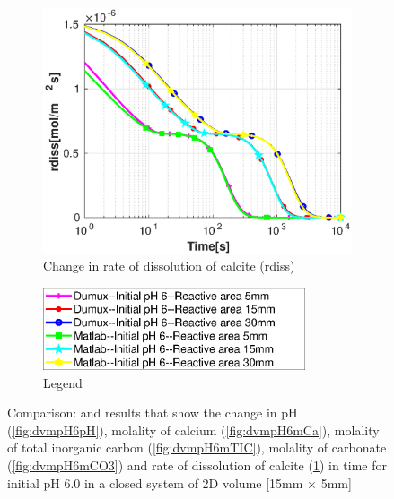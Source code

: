 \begin{figure}[!h]
    \hfill
    \begin{subfigure}{.5\linewidth}
            \centering
        \includegraphics[width=\textwidth]{PICTURES/dvm_pH6_rdiss.eps}
        \caption{Change in rate of dissolution of calcite (rdiss)}
        \label{fig:dvmpH6rdiss}
    \end{subfigure}%
  \hfill
  \hfill
    \begin{subfigure}{.5\linewidth}
            \centering
        \includegraphics[width=0.85\textwidth]{PICTURES/dvm_pH6_legend.eps}
        \caption{Legend}
        \label{fig:dvmpH6legend}
    \end{subfigure}%
    \caption{Comparison: \DuMuX and \MATLAB results that show the change in pH (\cref{fig:dvmpH6pH}), 
    molality of calcium (\cref{fig:dvmpH6mCa}), molality of total inorganic carbon (\cref{fig:dvmpH6mTIC}), 
    molality of carbonate (\cref{fig:dvmpH6mCO3}) and rate of dissolution of calcite (\cref{fig:dvmpH6rdiss}) 
    in time for initial pH 6.0 in a closed system of 2D volume [15mm $\times$ 5mm]} 
    \label{fig:comparisionDumuxMatlab_pH6.0}
\end{figure}

\endinput